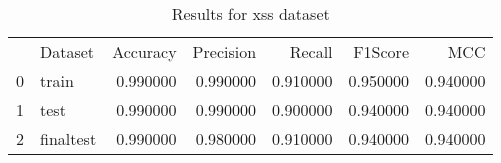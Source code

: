 \begin{table}
\caption{Results for xss dataset}
\begin{tabular}{llrrrrr}
 & Dataset & Accuracy & Precision & Recall & F1Score & MCC \\
0 & train & 0.990000 & 0.990000 & 0.910000 & 0.950000 & 0.940000 \\
1 & test & 0.990000 & 0.990000 & 0.900000 & 0.940000 & 0.940000 \\
2 & finaltest & 0.990000 & 0.980000 & 0.910000 & 0.940000 & 0.940000 \\
\end{tabular}
\end{table}
